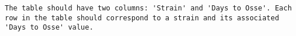 \begin{verbatim}
The table should have two columns: 'Strain' and 'Days to Osse'. Each row in the table should correspond to a strain and its associated 'Days to Osse' value.
\end{verbatim}
